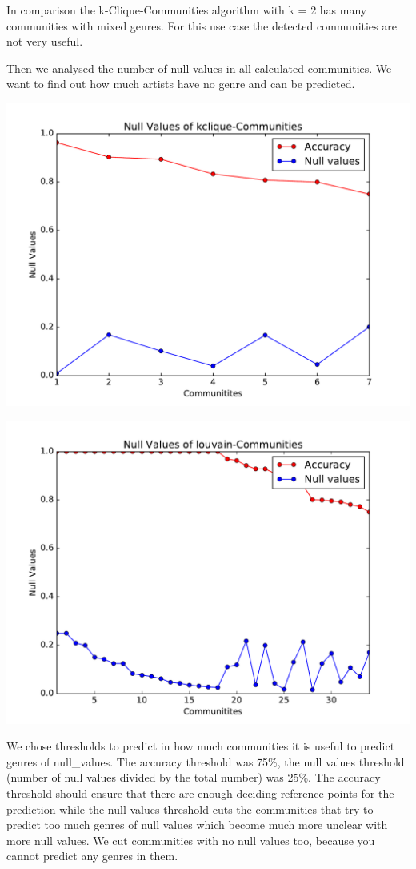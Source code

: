 \documentclass[11pt,a4paper,onecolumn,notitlepage]{article}
\begin{document}
In comparison the k-Clique-Communities algorithm with k = 2 has many communities with mixed genres. For this use case the detected communities are not very useful.

Then we analysed the number of null values in all calculated communities. We want to find out how much artists have no genre and can be predicted.

\includegraphics[scale=0.4]{spotify_null_kclique.pdf}

\includegraphics[scale=0.4]{spotify_null_louvain.pdf}

We chose thresholds to predict in how much communities it is useful to predict genres of null_values. The accuracy threshold was 75\%, the null values threshold (number of null values divided by the total number) was 25\%. The accuracy threshold should ensure that there are enough deciding reference points for the prediction while the null values threshold cuts the communities that try to predict too much genres of null values which become much more unclear with more null values. We cut communities with no null values too, because you cannot predict any genres in them.
\end{document}
